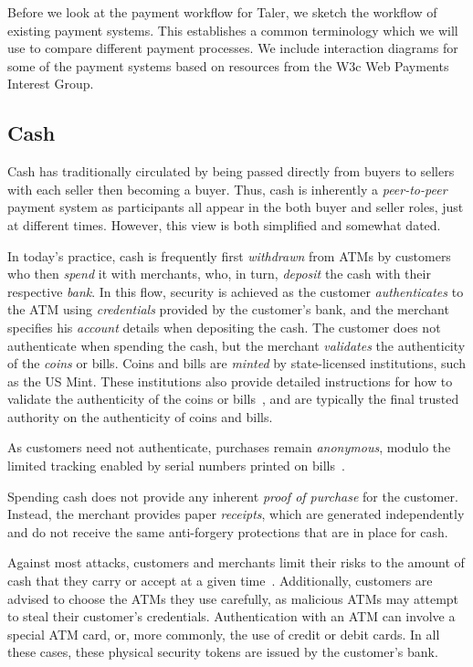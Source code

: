 \documentclass{llncs}
\begin{document}
Before we look at the payment workflow for Taler, we sketch the
workflow of existing payment systems. This establishes a common
terminology which we will use to compare different payment processes.
We include interaction diagrams for some of the payment systems
based on resources from the W3c Web Payments Interest Group.

\subsection{Cash}

Cash has traditionally circulated by being passed directly from buyers
to sellers with each seller then becoming a buyer. Thus, cash is
inherently a {\em peer-to-peer} payment system as participants all
appear in the both buyer and seller roles, just at different times.
However, this view is both simplified and
somewhat dated.

In today's practice, cash is frequently first {\em withdrawn} from
ATMs by customers who then {\em spend} it with merchants, who, in turn,
{\em deposit} the cash with their respective {\em bank}.  In this
flow, security is achieved as the customer {\em authenticates} to the
ATM using {\em credentials} provided by the customer's bank, and the
merchant specifies his {\em account} details when depositing the cash.
The customer does not authenticate when spending the cash, but the
merchant {\em validates} the authenticity of the {\em coins} or bills.
Coins and bills are {\em minted} by state-licensed institutions, such
as the US Mint.  These institutions also provide detailed instructions
for how to validate the authenticity of the coins or
bills~\cite{ezb2016ourmoney}, and are typically the final trusted
authority on the authenticity of coins and bills.

As customers need not authenticate, purchases remain {\em
anonymous}, modulo the limited tracking enabled by serial numbers
printed on bills~\cite{pets2004kuegler}.

Spending cash does not provide any inherent {\em proof of purchase}
for the customer. Instead, the merchant provides paper
{\em receipts}, which are generated independently and do not receive
the same anti-forgery protections that are in place for cash.

Against most attacks, customers and merchants limit their risks to the
amount of cash that they carry or accept at a given time~\cite{Bankrate}.
Additionally, customers are advised to choose the ATMs they use
carefully, as malicious ATMs may attempt to steal their customer's
credentials.  Authentication with an ATM can involve a special ATM
card, or, more commonly, the use of credit or debit cards.  In all these
cases, these physical security tokens are issued by the customer's
bank.
\end{document}
